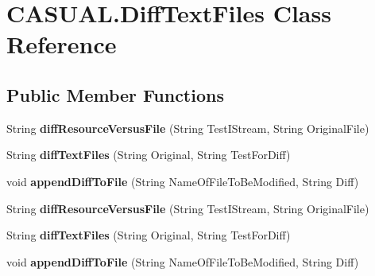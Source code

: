 \hypertarget{classCASUAL_1_1DiffTextFiles}{\section{C\-A\-S\-U\-A\-L.\-Diff\-Text\-Files Class Reference}
\label{classCASUAL_1_1DiffTextFiles}
}
\subsection*{Public Member Functions}
\begin{DoxyCompactItemize}
\item 
\hypertarget{classCASUAL_1_1DiffTextFiles_a0e4688f916157ad380172b563f289882}{String {\bfseries diff\-Resource\-Versus\-File} (String Test\-I\-Stream, String Original\-File)}\label{classCASUAL_1_1DiffTextFiles_a0e4688f916157ad380172b563f289882}

\item 
\hypertarget{classCASUAL_1_1DiffTextFiles_a15391ab2129d297765c49700e5e174a8}{String {\bfseries diff\-Text\-Files} (String Original, String Test\-For\-Diff)}\label{classCASUAL_1_1DiffTextFiles_a15391ab2129d297765c49700e5e174a8}

\item 
\hypertarget{classCASUAL_1_1DiffTextFiles_a2781947d0eddb10d4536698a56f08112}{void {\bfseries append\-Diff\-To\-File} (String Name\-Of\-File\-To\-Be\-Modified, String Diff)}\label{classCASUAL_1_1DiffTextFiles_a2781947d0eddb10d4536698a56f08112}

\item 
\hypertarget{classCASUAL_1_1DiffTextFiles_a0e4688f916157ad380172b563f289882}{String {\bfseries diff\-Resource\-Versus\-File} (String Test\-I\-Stream, String Original\-File)}\label{classCASUAL_1_1DiffTextFiles_a0e4688f916157ad380172b563f289882}

\item 
\hypertarget{classCASUAL_1_1DiffTextFiles_a15391ab2129d297765c49700e5e174a8}{String {\bfseries diff\-Text\-Files} (String Original, String Test\-For\-Diff)}\label{classCASUAL_1_1DiffTextFiles_a15391ab2129d297765c49700e5e174a8}

\item 
\hypertarget{classCASUAL_1_1DiffTextFiles_a2781947d0eddb10d4536698a56f08112}{void {\bfseries append\-Diff\-To\-File} (String Name\-Of\-File\-To\-Be\-Modified, String Diff)}\label{classCASUAL_1_1DiffTextFiles_a2781947d0eddb10d4536698a56f08112}

\end{DoxyCompactItemize}



